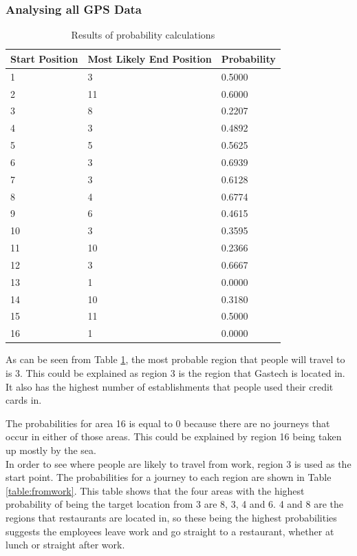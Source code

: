 \subsubsection{Analysing all GPS Data}
\begin{table}[H]
\begin{center}
\begin{tabular}{|l|l|l|}
\hline
Start Position & Most Likely End Position & Probability \\ \hline \hline
1  &   3   & 0.5000 \\ \hline
2  &   11  & 0.6000 \\ \hline
3  &    8  & 0.2207 \\ \hline
4  &    3  & 0.4892 \\ \hline
5  &    5  & 0.5625 \\ \hline
6  &    3  & 0.6939 \\ \hline
7  &    3  & 0.6128 \\ \hline
8  &    4  & 0.6774 \\ \hline
9  &    6  & 0.4615 \\ \hline
10 &    3  & 0.3595 \\ \hline
11 &   10  & 0.2366 \\ \hline 
12 &    3  & 0.6667 \\ \hline
13 &    1  & 0.0000 \\ \hline
14 &   10  & 0.3180 \\ \hline
15 &   11  & 0.5000 \\ \hline
16 &    1  & 0.0000 \\ \hline

\end{tabular}


\caption{\label{table:simplemodel}Results of probability calculations}
\end{center}
\end{table}

As can be seen from Table \ref{table:simplemodel}, the most probable region that people will travel to is 3. This could be explained as region 3 is the region that Gastech is located in. It also has the highest number of establishments that people used their credit cards in.


\noindent  The probabilities for area 16 is equal to 0 because there are no journeys that occur in either of those areas. This could be explained by region 16 being taken up mostly by  the sea.\\


\noindent In order to see where people are likely to travel from work, region 3 is used as the start point. The probabilities for a journey to each region are shown in Table \ref{table:fromwork}. This table shows that the four areas with the highest probability of being the target location from 3 are 8, 3, 4 and 6. 4 and 8 are the regions that restaurants are located in, so these being the highest probabilities suggests the employees leave work and go straight to a restaurant, whether at lunch or straight after work.

